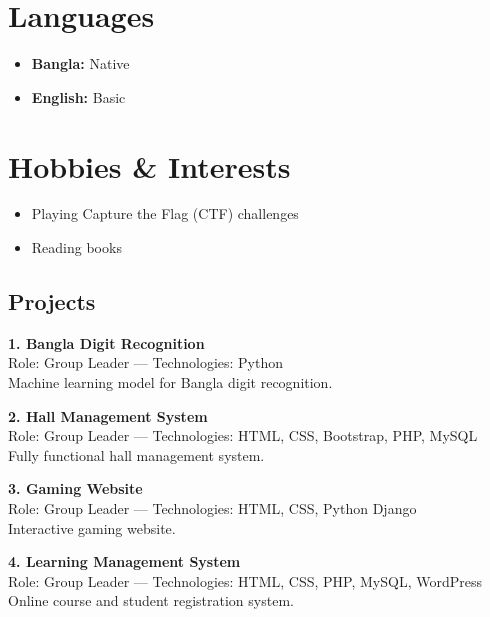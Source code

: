 \documentclass[a4paper,10pt]{article}
\begin{document}
\begin{multicols}{2}
\begin{flushleft}
        \section*{Languages}
        \begin{itemize}[left=0em, labelsep=1em, label=\textbullet, itemsep=0.2em]
            \item \textbf{Bangla:} Native
            \item \textbf{English:} Basic
        \end{itemize}

        \section*{Hobbies \& Interests}
        \begin{itemize}[left=0em, labelsep=1em, label=\textbullet, itemsep=0.2em]
            \item Playing Capture the Flag (CTF) challenges
            \item Reading books
        \end{itemize}
    \end{flushleft}

    \begin{flushleft}
        \section*{Projects}
        \noindent \textbf{1. Bangla Digit Recognition} \\
        Role: Group Leader — Technologies: Python \\
        Machine learning model for Bangla digit recognition.

        \vspace{0.3em}
        \noindent \textbf{2. Hall Management System} \\
        Role: Group Leader — Technologies: HTML, CSS, Bootstrap, PHP, MySQL \\
        Fully functional hall management system.

        \vspace{0.3em}
        \noindent \textbf{3. Gaming Website} \\
        Role: Group Leader — Technologies: HTML, CSS, Python Django\\
        Interactive gaming website.

        \vspace{0.3em}
        \noindent \textbf{4. Learning Management System} \\
        Role: Group Leader — Technologies: HTML, CSS, PHP, MySQL, WordPress \\
        Online course and student registration system.
        

\end{flushleft}
\end{multicols}
\end{document}
